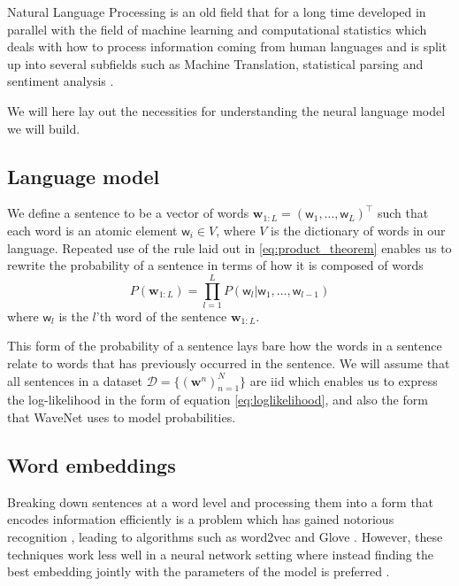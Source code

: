 Natural Language Processing is an old field that for a long
time developed in parallel with the field of machine learning and
computational statistics which deals with how to process information coming from
human languages and is split up into several subfields such as Machine
Translation, statistical parsing and sentiment
analysis \cite{sep-computational-linguistics}.

We will here lay out the necessities for understanding the neural language model we
will build.

\subsection{Language model}
We define a sentence to be a vector of words $\bm{w}_{1:L} = (\mathsf{w}_1, \dots,
\mathsf{w}_L)^{\top}$ such that each word is an atomic element $\mathsf{w}_i \in
V$, where $V$ is the dictionary of words in our language. Repeated use of the
rule laid out in \ref{eq:product_theorem} enables us to rewrite the probability
of a sentence in terms of how it is composed of words
\begin{equation}
  \label{eq:conditional_language_probability}
  P(\bm{w}_{1:L}) = \prod_{l = 1}^LP(\mathsf{w}_l | \mathsf{w}_1, \dots, \mathsf{w}_{l-1})
\end{equation}
where $\mathsf{w}_l$ is the $l$'th word of the sentence
$\bm{w}_{1:L}$\cite{Bengio:2003:NPL:944919.944966}.

This form of the probability of a sentence lays bare how the words in a sentence
relate to words that has previously occurred in the sentence. We will assume
that all sentences in a dataset $\mathcal{D} = \{(\bm{w}^n)_{n=1}^N\}$ are iid
which enables us to express the log-likelihood in the form of equation
\eqref{eq:loglikelihood}, and also the form that WaveNet uses to model
probabilities.

\subsection{Word embeddings}
Breaking down sentences at a word level and processing them into a form that
encodes information efficiently is a problem which has gained notorious
recognition \cite{DBLP:journals/corr/abs-1301-3781}, leading to algorithms such
as word2vec \cite{Mikolov:2013:DRW:2999792.2999959} and
Glove \cite{Pennington14glove:global}. However, these techniques work less well
in a neural network setting where instead finding the best embedding jointly with the parameters of the model is preferred \cite[p.~5-7]{goldberg2015primer}.

